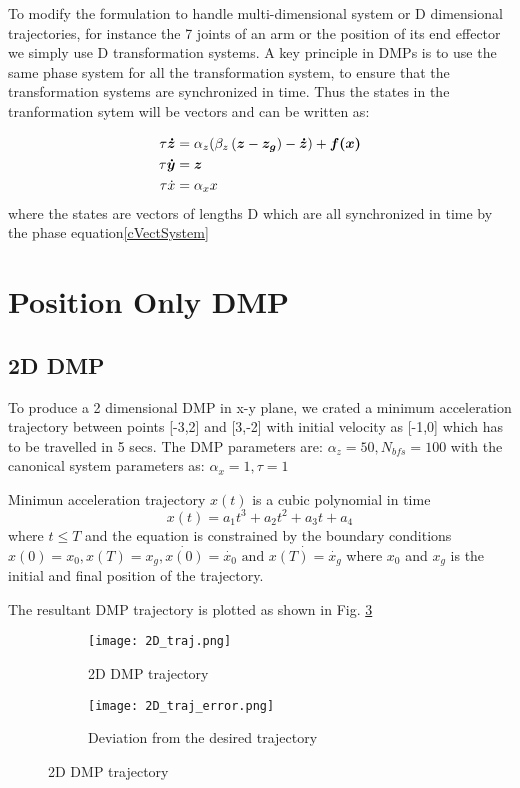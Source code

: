 To modify the formulation to handle multi-dimensional system or D dimensional trajectories, for instance the 7 joints of an arm or the position of its end effector
we simply use D transformation systems. A key principle in DMPs is to use the same phase system for all the
transformation system, to ensure that the transformation systems are synchronized in time.
Thus the states in the tranformation sytem will be vectors and can be written as:

\begin{subequations}\label{eq:dmpVectSystem}
    \begin{align}
        \tau \boldsymbol{\dot{z}}& = \alpha_z (\beta_z \left( \boldsymbol{z} - \boldsymbol{z_g} \right) - \boldsymbol{\dot{z}}) + \boldsymbol{f(x)}\label{TVectsystem}\\
        \tau \boldsymbol{\dot{y}}& = \boldsymbol{z} \\
        \tau \dot{x}& = \alpha_x x\label{cVectSystem}
    \end{align}
\end{subequations}
where the states are vectors of lengths D which are all synchronized in time by the phase equation\eqref{cVectSystem} 

\section{Position Only DMP}
\subsection{2D DMP}
To produce a 2 dimensional DMP in x-y plane, we crated a minimum acceleration trajectory between points
[-3,2] and [3,-2] with initial velocity as [-1,0] which has to be travelled in 5 secs. 
The DMP parameters are: $\alpha_z = 50, N_{bfs} = 100$ with the canonical system parameters as: 
$\alpha_x = 1, \tau = 1$

Minimun acceleration trajectory $x(t)$ is a cubic polynomial in time
\begin{equation}
    x(t) = a_1 t^3 + a_2 t^2 + a_3 t + a_4 
\end{equation}
where $t \leq T $ and the equation is constrained by the boundary conditions $x(0) = x_0, x(T) = x_g , \dot{x(0)} = \dot{x_0} 
\text{ and } \dot{x(T) = \dot{x_g}} $ where $x_0$ and $x_g$ is the initial and final position of the trajectory.


The resultant DMP trajectory is plotted as shown in Fig. \ref{fig:2D_traj}

\begin{figure}[h]
    \centering
    \begin{subfigure}{0.5\textwidth}
        \texttt{[image: 2D\_traj.png]}
        \caption{2D DMP trajectory}
        \label{fig:2D_traj}
    \end{subfigure}%
    \begin{subfigure}{0.5\textwidth}
        \centering
        \texttt{[image: 2D\_traj\_error.png]}
        \caption{Deviation from the desired trajectory}
        \label{fig:2D_traj_error}
    \end{subfigure}
    \caption{2D DMP trajectory}
    \label{fig:2D_traj}
\end{figure}

